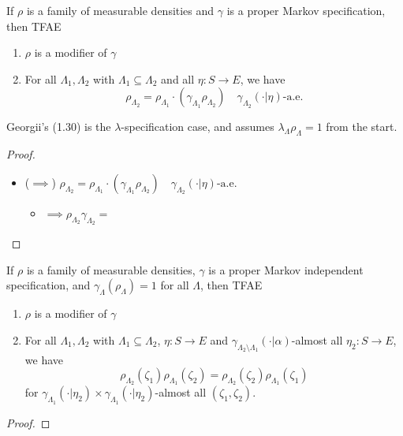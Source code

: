 \begin{proposition}
    \label{prop:modif-char}
    \leanok{}

    If $\rho$ is a family of measurable densities and $\gamma$ is a proper Markov specification, then TFAE
    \begin{enumerate}
        \item $\rho$ is a modifier of $\gamma$
        \item For all $\Lambda_1, \Lambda_2$ with $\Lambda_1 \subseteq \Lambda_2$ and all $\eta : S \to E$, we have
        \[\rho_{\Lambda_2} = \rho_{\Lambda_1}\cdot (\gamma_{\Lambda_1} \rho_{\Lambda_2}) \quad \gamma_{\Lambda_2}(\cdot|\eta)\text{-a.e.}\]
    \end{enumerate}
    Georgii's (1.30) is the $\lambda$-specification case, and assumes $\lambda_\Lambda\rho_\Lambda=1$ from the start.
\end{proposition}
\begin{proof}

    \begin{itemize}
        \item ($\implies$) $\rho_{\Lambda_2} = \rho_{\Lambda_1}\cdot (\gamma_{\Lambda_1} \rho_{\Lambda_2}) \quad \gamma_{\Lambda_2}(\cdot|\eta)\text{-a.e.}$
        \begin{itemize}
            \item $\implies \rho_{\Lambda_2}\gamma_{\Lambda_2} = $
        \end{itemize}
    \end{itemize}

\end{proof}

\begin{proposition}
    \label{prop:modif-indep-char}
    \leanok{}

    If $\rho$ is a family of measurable densities, $\gamma$ is a proper Markov independent specification,
    and $\gamma_\Lambda(\rho_\Lambda)=1$ for all $\Lambda$, then TFAE
    \begin{enumerate}
        \item $\rho$ is a modifier of $\gamma$
        \item For all $\Lambda_1, \Lambda_2$ with $\Lambda_1 \subseteq \Lambda_2$, $\eta : S \to E$ and $\gamma_{\Lambda_2 \setminus \Lambda_1}(\cdot|\alpha)$-almost all $\eta_2 : S \to E$, we have
        \[\rho_{\Lambda_2}(\zeta_1)\rho_{\Lambda_1}(\zeta_2) = \rho_{\Lambda_2}(\zeta_2) \rho_{\Lambda_1}(\zeta_1)\]
        for $\gamma_{\Lambda_1}(\cdot|\eta_2) \times \gamma_{\Lambda_1}(\cdot|\eta_2)$-almost all $(\zeta_1, \zeta_2)$.
    \end{enumerate}
\end{proposition}
\begin{proof}

\end{proof}

